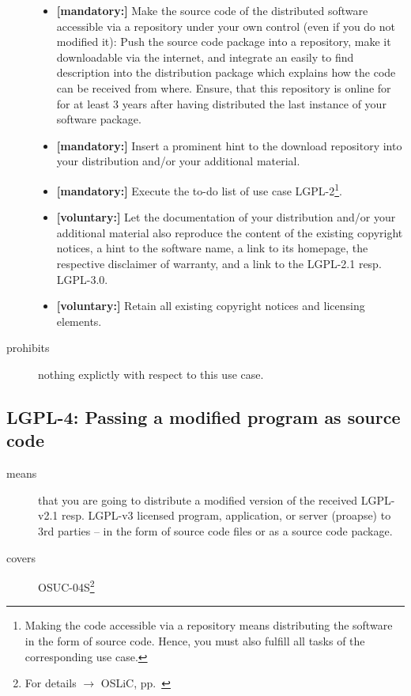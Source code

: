 \begin{description}
\begin{itemize}
  \item \textbf{[mandatory:]} Make the source code of the distributed software
  accessible via a repository under your own control (even if you do not
  modified it): Push the source code package into a repository, make it
  downloadable via the internet, and integrate an easily to find description
  into the distribution package which explains how the code can be received from
  where. Ensure, that this repository is online for for at least 3 years after
  having distributed the last instance of your software package.
  
  \item \textbf{[mandatory:]} Insert a prominent hint to the download repository
  into your distribution and/or your additional material.
  
  \item \textbf{[mandatory:]} Execute the to-do list of use case LGPL-2\footnote{
  Making the code accessible via a repository means distributing the software in
  the form of source code. Hence, you must also fulfill all tasks of the
  corresponding use case.}.
   
  \item \textbf{[voluntary:]} Let the documentation of your distribution and/or
  your additional material also reproduce the content of the existing
  copyright notices, a hint to the software name, a link to its homepage,
  the respective disclaimer of warranty, and a link to the LGPL-2.1 resp.
  LGPL-3.0.
  
  \item \textbf{[voluntary:]} Retain all existing copyright notices and
  licensing elements.

\end{itemize}

\item[prohibits] nothing explictly with respect to this use case.

\end{description}

\subsection{LGPL-4: Passing a modified program as source code}
\label{OSUC-04S-LGPL} 

\begin{description}
\item[means] that you are going to distribute a modified version of the received
LGPL-v2.1 resp. LGPL-v3 licensed program, application, or server (proapse) to
3rd parties -- in the form of source code files or as a source code package.
\item[covers] OSUC-04S\footnote{For details $\rightarrow$ OSLiC, pp.\
\pageref{OSUC-04S-DEF}}
\end{description}

